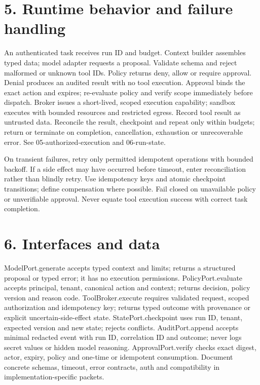 \documentclass[11pt,letterpaper]{article}
\begin{document}
\section*{5. Runtime behavior and failure handling}
An authenticated task receives run ID and budget. Context builder assembles typed data; model adapter requests a proposal. Validate schema and reject malformed or unknown tool IDs. Policy returns deny, allow or require approval. Denial produces an audited result with no tool execution. Approval binds the exact action and expires; re-evaluate policy and verify scope immediately before dispatch. Broker issues a short-lived, scoped execution capability; sandbox executes with bounded resources and restricted egress. Record tool result as untrusted data. Reconcile the result, checkpoint and repeat only within budgets; return or terminate on completion, cancellation, exhaustion or unrecoverable error. See 05-authorized-execution and 06-run-state.\par\smallskip
On transient failures, retry only permitted idempotent operations with bounded backoff. If a side effect may have occurred before timeout, enter reconciliation rather than blindly retry. Use idempotency keys and atomic checkpoint transitions; define compensation where possible. Fail closed on unavailable policy or unverifiable approval. Never equate tool execution success with correct task completion.\par\smallskip
\section*{6. Interfaces and data}
ModelPort.generate accepts typed context and limits; returns a structured proposal or typed error; it has no execution permissions. PolicyPort.evaluate accepts principal, tenant, canonical action and context; returns decision, policy version and reason code. ToolBroker.execute requires validated request, scoped authorization and idempotency key; returns typed outcome with provenance or explicit uncertain-side-effect state. StatePort.checkpoint uses run ID, tenant, expected version and new state; rejects conflicts. AuditPort.append accepts minimal redacted event with run ID, correlation ID and outcome; never logs secret values or hidden model reasoning. ApprovalPort.verify checks exact digest, actor, expiry, policy and one-time or idempotent consumption. Document concrete schemas, timeout, error contracts, auth and compatibility in implementation-specific packets.\par\smallskip
\end{document}
